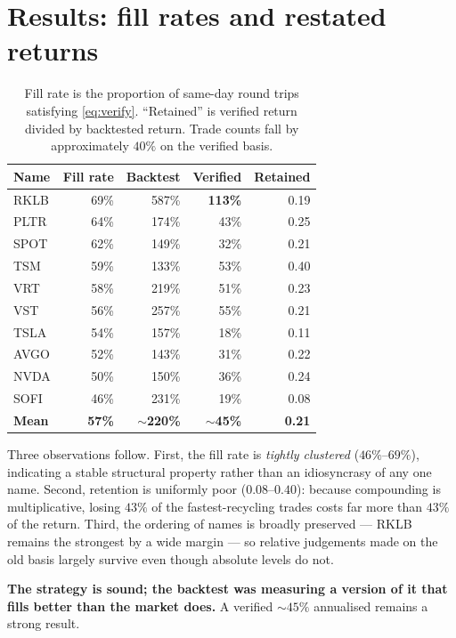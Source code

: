 \documentclass[11pt]{article}
\begin{document}
\section{Results: fill rates and restated returns}

\begin{table}[H]\centering\small
\renewcommand{\arraystretch}{1.2}
\begin{tabular}{l r r r r}
\toprule
\textbf{Name} & \textbf{Fill rate} & \textbf{Backtest} & \textbf{Verified} & \textbf{Retained}\\
\midrule
\rowcolor{bckeep} RKLB & 69\% & 587\% & \textbf{113\%} & 0.19\\
PLTR & 64\% & 174\% & 43\% & 0.25\\
SPOT & 62\% & 149\% & 32\% & 0.21\\
TSM  & 59\% & 133\% & 53\% & 0.40\\
VRT  & 58\% & 219\% & 51\% & 0.23\\
VST  & 56\% & 257\% & 55\% & 0.21\\
TSLA & 54\% & 157\% & 18\% & 0.11\\
AVGO & 52\% & 143\% & 31\% & 0.22\\
NVDA & 50\% & 150\% & 36\% & 0.24\\
\rowcolor{bcbad} SOFI & 46\% & 231\% & 19\% & 0.08\\
\midrule
\textbf{Mean} & \textbf{57\%} & \textbf{$\sim$220\%} & \textbf{$\sim$45\%} & \textbf{0.21}\\
\bottomrule
\end{tabular}
\caption*{\footnotesize Fill rate is the proportion of same-day round trips satisfying
\eqref{eq:verify}. ``Retained'' is verified return divided by backtested return. Trade counts
fall by approximately $40\%$ on the verified basis.}
\end{table}

Three observations follow. First, the fill rate is \emph{tightly clustered} ($46\%$--$69\%$),
indicating a stable structural property rather than an idiosyncrasy of any one name. Second,
retention is uniformly poor ($0.08$--$0.40$): because compounding is multiplicative, losing
$43\%$ of the fastest-recycling trades costs far more than $43\%$ of the return. Third, the
ordering of names is broadly preserved --- RKLB remains the strongest by a wide margin --- so
relative judgements made on the old basis largely survive even though absolute levels do not.

\textbf{The strategy is sound; the backtest was measuring a version of it that fills better than
the market does.} A verified $\sim\!45\%$ annualised remains a strong result.
\end{document}
